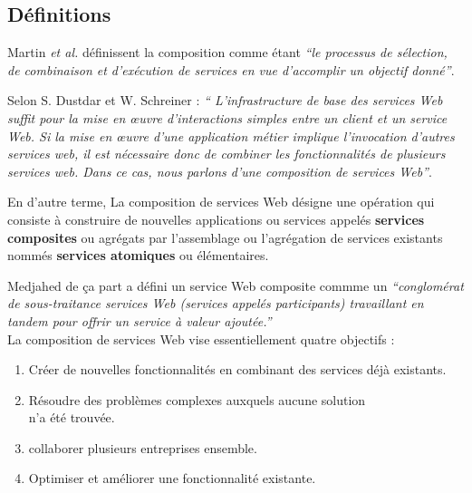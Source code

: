     \subsection{Définitions}
    \label{sec:definitions}

    Martin \emph{et al.} \cite{martin2004owl} définissent
    la composition comme étant \emph{``le processus de sélection, de
      combinaison et d'exécution de services en vue
      d'accomplir un objectif donné''}.

    Selon S. Dustdar et W. Schreiner \cite{dustdar2005survey} :
    \emph{`` L'infrastructure de base des services Web suffit pour la
      mise en œuvre d'interactions simples entre un client et un
      service Web. Si la mise en œuvre d'une application métier
      implique l'invocation d'autres services web, il est nécessaire
      donc de combiner les fonctionnalités de plusieurs services
      web. Dans ce cas, nous parlons d'une composition de services
      Web''}.

    En d'autre terme, La composition de services Web désigne une
    opération qui consiste à construire de nouvelles applications ou
    services appelés \textbf{services composites} ou agrégats par
    l'assemblage ou l'agrégation de services existants nommés
    \textbf{services atomiques} ou élémentaires.

    Medjahed \cite{medjahed2004thesis}de ça part a défini un service
    Web composite commme un \emph{``conglomérat de sous-traitance
      services Web (services appelés participants) travaillant en
      tandem pour offrir un service à valeur ajoutée.''}\\

    La composition de services Web vise essentiellement quatre
    objectifs \cite{driss2011approche}:
    \begin{enumerate}
      \item Créer de nouvelles fonctionnalités en combinant des services
        déjà existants.
      \item Résoudre des problèmes complexes auxquels aucune solution\\
        n'a été trouvée.
      \item collaborer plusieurs entreprises ensemble.
      \item Optimiser et améliorer une fonctionnalité existante.
    \end{enumerate}

